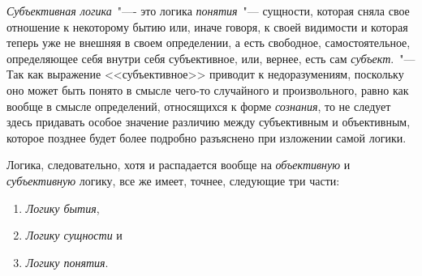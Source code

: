 
\emph{Субъективная логика}~"---- это логика \emph{понятия}~"--- сущности,
которая сняла свое отношение к некоторому бытию
или, иначе говоря, к своей видимости и которая теперь
уже не внешняя в своем определении, а есть свободное,
самостоятельное, определяющее себя внутри себя
субъективное, или, вернее, есть сам \emph{субъект}.~"--- Так как
выражение <<субъективное>> приводит к недоразумениям,
поскольку оно может быть понято в смысле чего-то случайного
и произвольного, равно как вообще в смысле
определений, относящихся к форме \emph{сознания}, то не следует
здесь придавать особое значение различию между
субъективным и объективным, которое позднее будет более
подробно разъяснено при изложении самой логики.

Логика, следовательно, хотя и распадается вообще на
\emph{объективную} и \emph{субъективную} логику, все же имеет, точнее,
следующие три части:
\begin{enumerate}[label=\Roman*.]
\item \emph{Логику бытия},
\item \emph{Логику сущности} и
\item \emph{Логику понятия}.
\end{enumerate}

